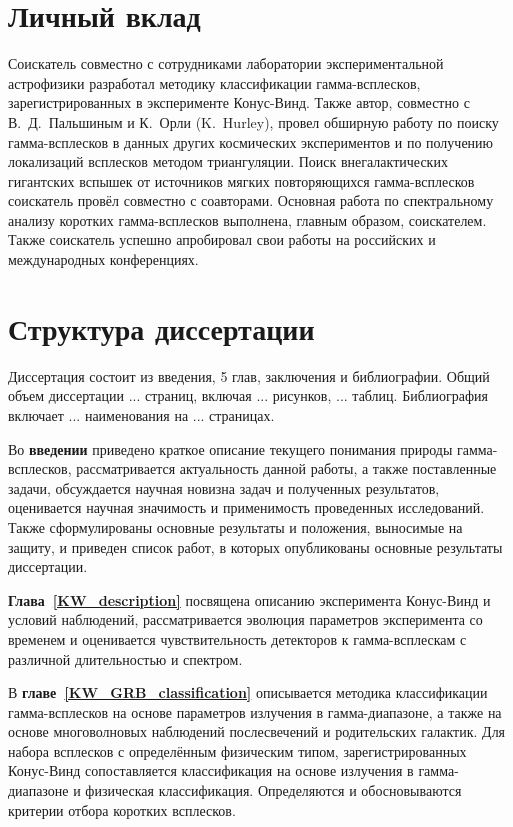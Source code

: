 \section*{Личный вклад}
Соискатель совместно с сотрудниками лаборатории экспериментальной астрофизики 
разработал методику классификации гамма-всплесков, зарегистрированных в эксперименте 
Конус-Винд. Также автор, совместно с В.~Д.~Пальшиным и К.~Орли (K.~Hurley), 
провел обширную работу по поиску гамма-всплесков в данных других космических 
экспериментов и по получению локализаций всплесков методом триангуляции.
Поиск внегалактических гигантских вспышек от источников мягких повторяющихся
гамма-всплесков соискатель провёл совместно с соавторами. 
Основная работа по спектральному анализу коротких гамма-всплесков выполнена, главным образом, соискателем.
Также соискатель успешно апробировал свои работы на российских и международных конференциях.

\section*{Структура диссертации}
Диссертация состоит из введения, 5 глав, заключения и библиографии.
Общий объем диссертации ... страниц, включая ... рисунков, ... таблиц. 
Библиография включает ... наименования на ... страницах.

Во \textbf{введении} приведено краткое описание текущего понимания природы гамма-всплесков,
рассматривается актуальность данной работы, а также поставленные задачи, 
обсуждается научная новизна задач и полученных результатов, 
оценивается научная значимость и применимость проведенных исследований.
Также сформулированы основные результаты и положения, выносимые на защиту, и приведен
список работ, в которых опубликованы основные результаты диссертации.

\textbf{Глава~\ref{KW_description}} посвящена описанию эксперимента Конус-Винд и условий
наблюдений, рассматривается эволюция параметров эксперимента со временем и 
оценивается чувствительность детекторов к гамма-всплескам с различной длительностью и спектром.

В \textbf{главе~\ref{KW_GRB_classification}} описывается методика классификации 
гамма-всплесков на основе параметров излучения в гамма-диапазоне, а также на основе 
многоволновых наблюдений послесвечений и родительских галактик. Для набора всплесков
с определённым физическим типом, зарегистрированных Конус-Винд сопоставляется 
классификация на основе излучения в гамма-диапазоне и физическая классификация.
Определяются и обосновываются критерии отбора коротких всплесков.


